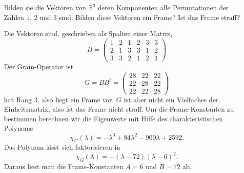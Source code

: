 Bilden sie die Vektoren von $\mathbb R^3$ deren Komponenten alle Permutationen
der Zahlen $1$, $2$ und $3$ sind.
Bilden diese Vektoren ein Frame?
Ist das Frame straff?

\begin{loesung}
Die Vektoren sind, geschrieben als Spalten einer Matrix,
\[
B
=
\begin{pmatrix}
1&2&1&2&3&3\\
2&1&3&3&1&2\\
3&3&2&1&2&1
\end{pmatrix}
\]
Der Gram-Operator ist
\[
G=BB^t
=
\begin{pmatrix}
28&22&22\\
22&28&22\\
22&22&28
\end{pmatrix}
\]
hat Rang $3$, also liegt ein Frame vor.
$G$ ist aber nicht ein Vielfaches der Einheitsmatrix, also ist das Frame
nicht straff.
Um die Frame-Konstanten zu bestimmen berechnen wir die Eigenwerte
mit Hilfe des charakteristischen Polynoms
\[
\chi_{G}(\lambda)
=
-\lambda^3 + 84\lambda^2 -900 \lambda + 2592.
\]
Das Polynom lässt sich faktorisieren in
\[
\chi_{G}(\lambda)
=
-(\lambda - 72)(\lambda - 6)^2.
\]
Daraus liest man die Frame-Konstanten $A=6$ und $B=72$ ab.
\end{loesung}

